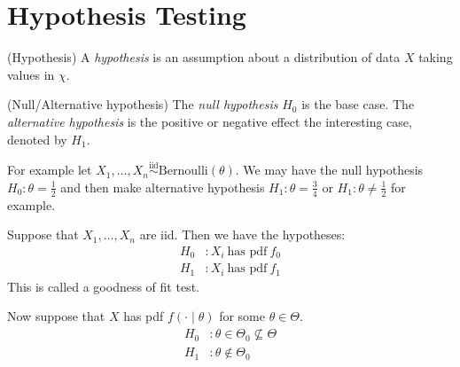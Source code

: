 \documentclass{article}
\newcommand{\iid}{\overset{\text{iid}}{\sim}}
\begin{document}
\section{Hypothesis Testing}
\begin{definition}
	(Hypothesis) A \textit{hypothesis} is an assumption about a distribution of data $ X $ taking values in $ \chi $.
\end{definition}
\begin{definition}
	(Null/Alternative hypothesis) The \textit{null hypothesis} $ H_0 $ is the base case. The \textit{alternative hypothesis} is the positive or negative effect the interesting case, denoted by $ H_1 $.
\end{definition}
For example let $ X_1,\dots, X_n\iid \mathrm{Bernoulli}(\theta) $. We may have the null hypothesis $ H_0:\theta=\frac 12 $ and then make alternative hypothesis $ H_1: \theta = \frac 34 $ or $ H_1:\theta \ne \frac 12 $ for example.\par
Suppose that $ X_1,\dots, X_n $ are iid. Then we have the hypotheses:
\begin{align*}
	H_0 &: X_i \ \text{has pdf}\ f_0 \\
	H_1 &: X_i \ \text{has pdf}\ f_1
\end{align*}
This is called a goodness of fit test.\par
Now suppose that $ X $ has pdf $ f(\cdot\mid \theta) $ for some $ \theta\in \Theta $. 
\begin{align*}
	H_0 &: \theta\in\Theta_0\nsubseteq \Theta\\
	H_1 &: \theta\notin \Theta_0
\end{align*}
\end{document}
